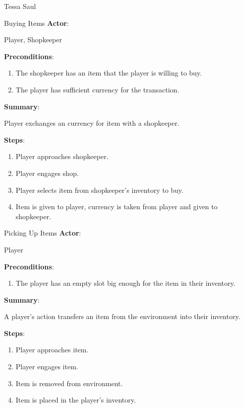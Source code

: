 \documentclass[12pt]{report}
\begin{document}
\begin{section}{Tessa Saul}
\begin{subsection}{Buying Items}
\textbf{Actor}:

Player, Shopkeeper

\textbf{Preconditions}:

\begin{enumerate}
\item The shopkeeper has an item that the player is willing to buy.
\item The player has sufficient currency for the transaction.
\end{enumerate}

\textbf{Summary}:

Player exchanges an currency for item with a shopkeeper.

\textbf{Steps}:
 
\begin{enumerate}
\item Player approaches shopkeeper.
\item Player engages shop.
\item Player selects item from shopkeeper's inventory to buy.
\item Item is given to player, currency is taken from player and given to
shopkeeper.
\end{enumerate}
\end{subsection}

\begin{subsection}{Picking Up Items}
\textbf{Actor}:

Player

\textbf{Preconditions}:

\begin{enumerate}
\item The player has an empty slot big enough for the item in their
inventory.
\end{enumerate}

\textbf{Summary}:

A player's action transfers an item from the environment into their
inventory.

\textbf{Steps}:

\begin{enumerate}
\item Player approaches item.
\item Player engages item.
\item Item is removed from environment.
\item Item is placed in the player's  inventory.
\end{enumerate}
\end{subsection}
\end{section}
\end{document}

